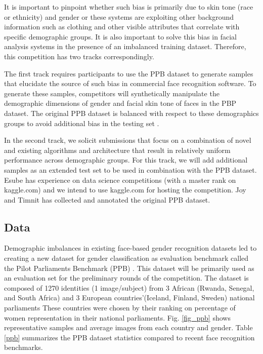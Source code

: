 \documentclass[11pt, oneside]{article}
\makeatletter
\let\@internalcite\cite
\def\cite{\def\citeauthoryear##1##2{##1, ##2}\@internalcite}
\makeatother
\begin{document}
It is important to pinpoint whether such bias is primarily due to skin tone (race or ethnicity) and gender or these systems are exploiting other background information such as clothing and other visible attributes that correlate with specific demographic groups. It is also important to solve this bias in facial analysis systems in the presence of an imbalanced training dataset. Therefore, this competition has two tracks correspondingly. 

The first track requires participants to use the PPB dataset to generate samples that elucidate the source of such bias in commercial face recognition software.  To generate these samples, competitors will synthetically manipulate the demographic dimensions of gender and facial skin tone of faces in the PBP dataset. The original PPB dataset is balanced with respect to these demographics groups to avoid additional bias in the testing set \cite{buolamwini2018gender}. 

In the second track, we solicit submissions that focus on a combination of novel and existing algorithms and architecture that result in relatively uniform performance across demographic groups. For this track, we will add additional samples as an extended test set to be used in combination with the PPB dataset. Esube has experience on data science competitions (with a master rank on kaggle.com) and we intend to use kaggle.com for hosting the competition. Joy and Timnit has collected and annotated the original PPB dataset.

\subsection{Data}

Demographic imbalances in existing face-based gender recognition datasets led to creating a new dataset for gender classification as evaluation benchmark called the Pilot Parliaments Benchmark (PPB) \cite{buolamwini2018gender}. This dataset will be primarily used as an evaluation set for the preliminary rounds of the competition. The dataset is composed of 1270 identities (1 image/subject) from 3 African (Rwanda, Senegal, and South Africa) and 3 European countries'(Iceland, Finland, Sweden) national parliaments These countries were chosen by their ranking on percentage of women representation in their national parliaments. Fig. \ref{fig_ppb} shows representative samples and average images from each country and gender. Table \ref{ppb} summarizes the PPB dataset statistics compared to recent face recognition benchmarks.
\end{document}
